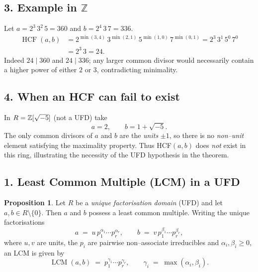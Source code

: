 \documentclass[12pt]{article}
\theoremstyle{definition} %
\newtheorem{proposition}{Proposition}
\theoremstyle{plain} %
\begin{document}
\subsection*{3.  Example in \(\mathbb Z\)}

Let \(a = 2^{3}\,3^{2}\,5 = 360\) and \(b = 2^{4}\,3\,7 = 336\).
\[
  \begin{aligned}
     \operatorname{HCF}(a,b)
     &= 2^{\min(3,4)}\,3^{\min(2,1)}\,5^{\min(1,0)}\,7^{\min(0,1)}
      = 2^{3}\,3^{1}\,5^{0}\,7^{0} \\
     &= 2^{3}\,3 = 24 .
  \end{aligned}
\]
Indeed \(24\mid360\) and \(24\mid336\); any larger common divisor would
necessarily contain a higher power of either \(2\) or \(3\), contradicting
minimality.

\subsection*{4.  When an HCF can fail to exist}

In \(R=\Bbb Z[\sqrt{-5}]\) (not a UFD) take
\[
    a = 2,\qquad b = 1+\sqrt{-5}.
\]
The only common divisors of \(a\) and \(b\) are the \emph{units}
\(\pm1\), so there is no \emph{non–unit} element satisfying the
maximality property.  Thus HCF\((a,b)\) does \emph{not} exist in this
ring, illustrating the necessity of the UFD hypothesis in the theorem.

\subsection*{1.  Least Common Multiple (LCM) in a UFD}

\begin{proposition}
  Let \(R\) be a \emph{unique factorisation domain} (UFD) and let
  \(a,b\in R\setminus\{0\}\).  
  Then \(a\) and \(b\) possess a least common multiple.
  Writing the unique factorisations
  \[
     a \;=\; u\,p_{1}^{\alpha_{1}}\cdots p_{r}^{\alpha_{r}},
     \qquad
     b \;=\; v\,p_{1}^{\beta_{1}}\cdots p_{r}^{\beta_{r}},
  \]
  where \(u,v\) are units, the \(p_{i}\) are pairwise non–associate irreducibles
  and \(\alpha_{i},\beta_{i}\ge0\), an LCM is given by
  \[
       \operatorname{LCM}(a,b)
       \;=\;
       p_{1}^{\gamma_{1}}\cdots p_{r}^{\gamma_{r}},
       \qquad
       \gamma_{i} \;=\; \max(\alpha_{i},\beta_{i}).
  \]
\end{proposition}
\end{document}
